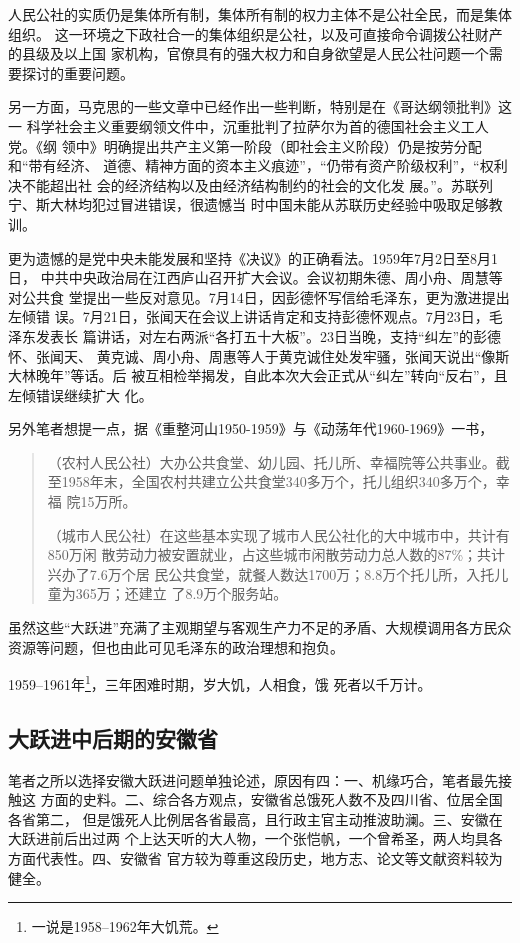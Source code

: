人民公社的实质仍是集体所有制，集体所有制的权力主体不是公社全民，而是集体组织。
这一环境之下政社合一的集体组织是公社，以及可直接命令调拨公社财产的县级及以上国
家机构，官僚具有的强大权力和自身欲望是人民公社问题一个需要探讨的重要问题。

另一方面，马克思的一些文章中已经作出一些判断，特别是在《哥达纲领批判》这一
科学社会主义重要纲领文件中，沉重批判了拉萨尔为首的德国社会主义工人党。《纲
领中》明确提出共产主义第一阶段（即社会主义阶段）仍是按劳分配和“带有经济、
道德、精神方面的资本主义痕迹”，“仍带有资产阶级权利”，“权利决不能超出社
会的经济结构以及由经济结构制约的社会的文化发
展。”。\cite[435]{maenwen3}苏联列宁、斯大林均犯过冒进错误，很遗憾当
时中国未能从苏联历史经验中吸取足够教训。

更为遗憾的是党中央未能发展和坚持《决议》的正确看法。1959年7月2日至8月1日，
中共中央政治局在江西庐山召开扩大会议。会议初期朱德、周小舟、周慧等对公共食
堂提出一些反对意见。7月14日，因彭德怀写信给毛泽东，更为激进提出左倾错
误。7月21日，张闻天在会议上讲话肯定和支持彭德怀观点。7月23日，毛泽东发表长
篇讲话，对左右两派“各打五十大板”。23日当晚，支持“纠左”的彭德怀、张闻天、
黄克诚、周小舟、周惠等人于黄克诚住处发牢骚，张闻天说出“像斯大林晚年”等话。后
被互相检举揭发，自此本次大会正式从“纠左”转向“反右”，且左倾错误继续扩大
化。

另外笔者想提一点，据《重整河山1950-1959》与《动荡年代1960-1969》一书，
\begin{quotation}
  （农村人民公社）大办公共食堂、幼儿园、托儿所、幸福院等公共事业。截
  至1958年末，全国农村共建立公共食堂340多万个，托儿组织340多万个，幸福
  院15万所。

  （城市人民公社）在这些基本实现了城市人民公社化的大中城市中，共计有850万闲
  散劳动力被安置就业，占这些城市闲散劳动力总人数的87\%；共计兴办了7.6万个居
  民公共食堂，就餐人数达1700万；8.8万个托儿所，入托儿童为365万；还建立
  了8.9万个服务站。
\end{quotation}
虽然这些“大跃进”充满了主观期望与客观生产力不足的矛盾、大规模调用各方民众
资源等问题，但也由此可见毛泽东的政治理想和抱负。

1959--1961年\footnote{一说是1958--1962年大饥荒。}，三年困难时期，岁大饥，人相食，饿
死者以千万计。

\subsection{大跃进中后期的安徽省}

笔者之所以选择安徽大跃进问题单独论述，原因有四：一、机缘巧合，笔者最先接触这
方面的史料。二、综合各方观点，安徽省总饿死人数不及四川省、位居全国各省第二，
但是饿死人比例居各省最高，且行政主官主动推波助澜。三、安徽在大跃进前后出过两
个上达天听的大人物，一个张恺帆，一个曾希圣，两人均具各方面代表性。四、安徽省
官方较为尊重这段历史，地方志、论文等文献资料较为健全。

